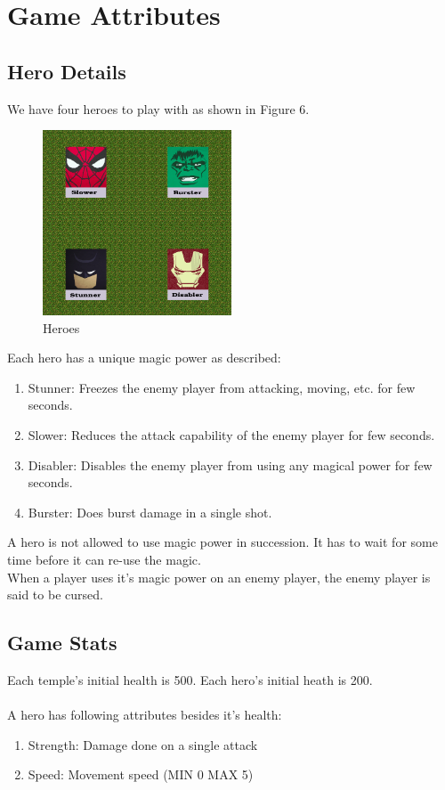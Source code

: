 \chapter{Game Attributes}

\section{Hero Details}
We have four heroes to play with as shown in Figure 6.\\

\begin{figure}[htp]
\centering
\includegraphics[width=0.5\textwidth]{Heros.png}
\caption{\label{fig:heroes}Heroes}
\end{figure}

Each hero has a unique magic power as described:
\begin{enumerate}
\item Stunner: Freezes the enemy player from attacking, moving, etc. for few seconds.
\item Slower: Reduces the attack capability of the enemy player for few seconds.
\item Disabler: Disables the enemy player from using any magical power for few seconds.
\item Burster: Does burst damage in a single shot.
\end{enumerate}

A hero is not allowed to use magic power in succession. It has to wait for some time before it can re-use the magic. \\

When a player uses it’s magic power on an enemy player, the enemy player is said to be cursed.

\section{Game Stats}
Each temple’s initial health is 500. Each hero’s initial heath is 200.
\\ \\
A hero has following attributes besides it’s health:
\begin{enumerate}
\item Strength: Damage done on a single attack
\item Speed: Movement speed (MIN 0 MAX 5)
\end{enumerate}

